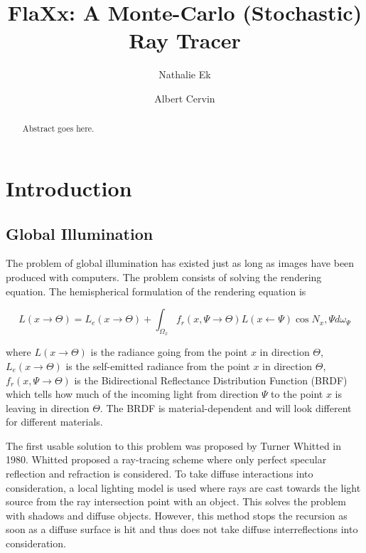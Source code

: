 \documentclass[a4paper]{report}
\begin{document}
\title{FlaXx: A Monte-Carlo (Stochastic) Ray Tracer}
\author{Nathalie Ek \and Albert Cervin}

\maketitle

\begin{abstract}
Abstract goes here.
\end{abstract}

\tableofcontents

\listoffigures

\chapter{Introduction}

\section{Global Illumination}

The problem of global illumination has existed just as long as images
have been produced with computers. The problem consists of solving the
rendering equation. The hemispherical formulation of the rendering equation is

\begin{equation}
  L(x \to \Theta) = L_e(x \to \Theta) + \int_{\Omega_x}f_r(x,\Psi \to \Theta)L(x \gets \Psi)\cos{N_x,\Psi}d\omega_\Psi
  \label{eq:renderingeq}
\end{equation}

where \(L(x \to \Theta)\) is the radiance going from the point \(x\)
in direction \(\Theta\), \(L_e(x \to \Theta) \) is the self-emitted
radiance from the point \(x\) in direction \(\Theta\), \(f_r(x,\Psi
\to \Theta)\) is the Bidirectional Reflectance Distribution Function
(BRDF) which tells how much of the incoming light from direction
\(\Psi\) to the point \(x\) is leaving in direction \(\Theta\). The
BRDF is material-dependent and will look different for different materials.

The first usable solution to this problem was proposed by Turner
Whitted \cite{whitted} in 1980. Whitted proposed a ray-tracing scheme
where only perfect specular reflection and refraction is
considered. To take diffuse interactions into consideration, a local
lighting model is used where rays are cast towards the light source
from the ray intersection point with an object. This solves the
problem with shadows and diffuse objects. However, this method stops
the recursion as soon as a diffuse surface is hit and thus does not
take diffuse interreflections into consideration.
\end{document}
